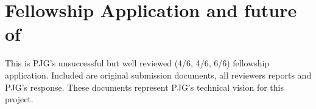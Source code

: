 
\chapter{Fellowship Application and future of \steel}
\label{Appx:HF}

This is PJG's unsuccessful but well reviewed (4/6, 4/6, 6/6) fellowship application. Included are original submission documents, all reviewers reports and PJG's response. These documents represent PJG's technical vision for this project.



